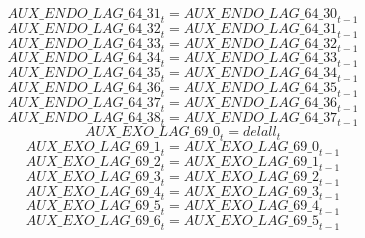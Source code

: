 \begin{dmath}
{AUX\_ENDO\_LAG\_64\_31}_{t}={AUX\_ENDO\_LAG\_64\_30}_{t-1}
\end{dmath}
\begin{dmath}
{AUX\_ENDO\_LAG\_64\_32}_{t}={AUX\_ENDO\_LAG\_64\_31}_{t-1}
\end{dmath}
\begin{dmath}
{AUX\_ENDO\_LAG\_64\_33}_{t}={AUX\_ENDO\_LAG\_64\_32}_{t-1}
\end{dmath}
\begin{dmath}
{AUX\_ENDO\_LAG\_64\_34}_{t}={AUX\_ENDO\_LAG\_64\_33}_{t-1}
\end{dmath}
\begin{dmath}
{AUX\_ENDO\_LAG\_64\_35}_{t}={AUX\_ENDO\_LAG\_64\_34}_{t-1}
\end{dmath}
\begin{dmath}
{AUX\_ENDO\_LAG\_64\_36}_{t}={AUX\_ENDO\_LAG\_64\_35}_{t-1}
\end{dmath}
\begin{dmath}
{AUX\_ENDO\_LAG\_64\_37}_{t}={AUX\_ENDO\_LAG\_64\_36}_{t-1}
\end{dmath}
\begin{dmath}
{AUX\_ENDO\_LAG\_64\_38}_{t}={AUX\_ENDO\_LAG\_64\_37}_{t-1}
\end{dmath}
\begin{dmath}
{AUX\_EXO\_LAG\_69\_0}_{t}={delall}_{t}
\end{dmath}
\begin{dmath}
{AUX\_EXO\_LAG\_69\_1}_{t}={AUX\_EXO\_LAG\_69\_0}_{t-1}
\end{dmath}
\begin{dmath}
{AUX\_EXO\_LAG\_69\_2}_{t}={AUX\_EXO\_LAG\_69\_1}_{t-1}
\end{dmath}
\begin{dmath}
{AUX\_EXO\_LAG\_69\_3}_{t}={AUX\_EXO\_LAG\_69\_2}_{t-1}
\end{dmath}
\begin{dmath}
{AUX\_EXO\_LAG\_69\_4}_{t}={AUX\_EXO\_LAG\_69\_3}_{t-1}
\end{dmath}
\begin{dmath}
{AUX\_EXO\_LAG\_69\_5}_{t}={AUX\_EXO\_LAG\_69\_4}_{t-1}
\end{dmath}
\begin{dmath}
{AUX\_EXO\_LAG\_69\_6}_{t}={AUX\_EXO\_LAG\_69\_5}_{t-1}
\end{dmath}
